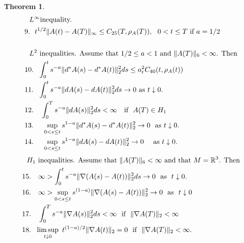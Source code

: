 \documentclass[12pt]{article}
\newtheorem{theorem}{Theorem}[section]
\def \R{\mathbb R}
\def \n{\nabla}
\numberwithin{equation}{section}
\begin{document}
\begin{theorem}
\begin{align}
&\ \ L^\infty \text{inequality.} \notag \\         
&9. \ \  t^{1/2} \|  A(t) - A(T)\|_\infty    \le  C_{25}(T, \rho_A(T)) ,\ \ 0 < t \le T\ \text{if}\ a =1/2  \label{ibA72}\\
 &\     \notag\\
 &\ \  L^2 \text{ inequalities.     Assume that $1/2 \le a <1$ and $\|A(T)\|_6 < \infty$. Then} \notag \\
&10. \ \ \int_0^t s^{-a} \| d^*A(s) -d^*A(t) \|_2^2ds \le a_t^2 C_{40}(t, \rho_A(t))               \label{ibA10b}\\
 &11.    \ \   \int_0^t s^{-a} \| dA(s) -dA(t) \|_2^2ds \rightarrow 0\ \text{as}\ t\downarrow 0.  \label{ibA10c} \\
 &12. \ \ \ \int_0^T s^{-a}\| dA(s) \|_2^2ds < \infty\ \ \ \text{if} \ \ A(T) \in H_1\                     \label{ibA10c1} \\
 &13.  \ \ \ \ \sup_{0 < s \le t} s^{1-a}   \| d^*A(s) -d^*A(t) \|_2^2 \rightarrow 0\
                                                                                     \ \text{as}\ t\downarrow 0.   \label{ibA10d}    \\
&14. \ \ \ \ \sup_{0 < s \le t} s^{1-a}   \| dA(s) -dA(t) \|_2^2 \rightarrow 0\ \ \
                                                                                      \ \text{as}\ t\downarrow 0.   \label{ibA10e}                                                                                                                      
 \end{align}
 \begin{align}
&\ \ \text{$H_1$ inequalities.     Assume that  $\|A(T)\|_6 < \infty$ and that  $M = \R^3$. Then} \notag\\
&15.\ \  \ \infty >   \int_0^t s^{-a} \| \n (A(s)- A(t)) \|_2^2 ds  \rightarrow 0\ \ 
                                                                 \text{as}\ \ t \downarrow 0.       \label{ibA12}\\
&16. \ \ \ \infty >     \sup_{0 < s \le t} s^{(1-a)} \| \n (A(s) - A(t))\|_2^2 \rightarrow 0\ \ 
                                                                 \text{as}\ \ t \downarrow 0 \label{ibA13a} \\
&17. \ \ \   \int_0^T s^{-a} \| \n A(s) \|_2^2 ds < \infty\ \ \text{if}\ \ \|\n A(T)\|_2 < \infty  
                                                                                                         \label{ibA13b}\\
&18.  \ \ \limsup_{t\downarrow 0}\  t^{(1-a)/2} \| \n A(t)\|_2 = 0 \ \ 
                                                     \text{if}\ \ \|\n A(T)\|_2 < \infty.   \label{ibA13}       
\end{align}
\end{theorem}
\end{document}
